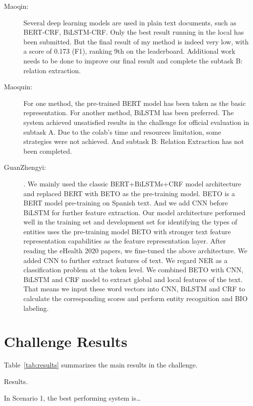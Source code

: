 \documentclass[a4paper,11pt,twocolumn,twoside]{article}
\begin{document}
\begin{description}
  \item[Maoqin:]  Several deep learning models are used in plain text documents, such as
  BERT-CRF, BiLSTM-CRF. Only the best result running in the local has been submitted. But the final
  result of my method is indeed very low, with a score of 0.173 (F1), ranking 9th on the leaderboard.
  Additional work needs to be done to improve our final result and complete the subtask B: relation
  extraction.

  \item[Maoquin:] For one method, the pre-trained BERT model has been taken as the basic representation.
  For another method, BiLSTM has been preferred. The system achieved unsatisfied results in the
  challenge for official evaluation in subtask A. Due to the colab’s time and resources limitation,
  some strategies were not achieved. And subtask B: Relation Extraction has not been completed.
  
  \item [GuanZhengyi:] . We mainly used the classic BERT+BiLSTMs+CRF model architecture and replaced BERT
  with BETO as the pre-training model. BETO is a BERT model pre-training on Spanish text. And we
  add CNN before BiLSTM for further feature extraction. Our model architecture performed well in the
  training set and development set for identifying the types of entities
  uses the pre-training model BETO with stronger text feature
  representation capabilities as the feature representation layer. After reading the eHealth 2020
  papers, we fine-tuned the above architecture. We added CNN to further extract features of
  text. We regard NER as a classification problem at the token level. We combined BETO with
  CNN, BiLSTM and CRF model to extract global and local features of the text. That means we
  input these word vectors into CNN, BiLSTM and CRF to calculate the corresponding scores and
  perform entity recognition and BIO labeling.
\end{description}

\section{Challenge Results}

Table~\ref{tab:results} summarizes the main results in the challenge.

\begin{table}
  \caption{Results.\label{tab:results}}
\end{table}

In Scenario 1, the best performing system is\dots
\end{document}
